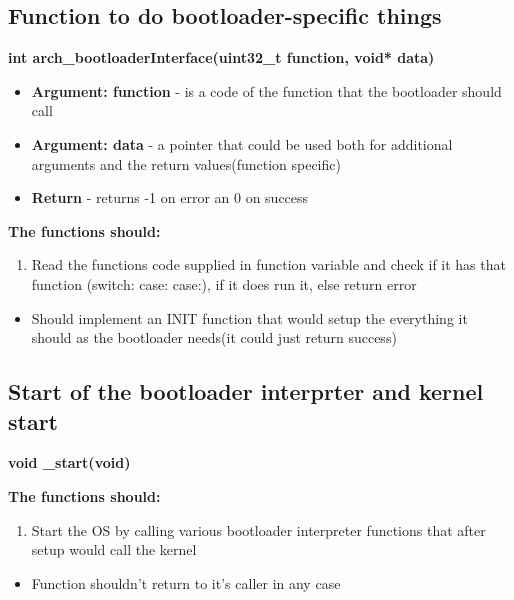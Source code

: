 \documentclass{report}
\begin{document}
\subsection*{Function to do bootloader-specific things}
\textbf{int arch\_bootloaderInterface(uint32\_t function, void* data)}
\begin{flushleft}
\begin{itemize}
	\item \textbf{Argument: function} - is a code of the function that the bootloader should call
	\item \textbf{Argument: data} - a pointer that could be used both for additional arguments and the return values(function specific)
	\item \textbf{Return} - returns -1 on error an 0 on success
\end{itemize}

\textbf{The functions should:}
\begin{enumerate}
	\item Read the functions code supplied in function variable and check if it has that function (switch: case: case:), if it does run it, else return error
\end{enumerate}
\begin{itemize}
	\item Should implement an INIT function that would setup the everything it should as the bootloader needs(it could just return success)
\end{itemize}
\end{flushleft}


\subsection*{Start of the bootloader interprter and kernel start}
\textbf{void \_start(void)}
\begin{flushleft}

\textbf{The functions should:}
\begin{enumerate}
	\item Start the OS by calling various bootloader interpreter functions that after setup would call the kernel
\end{enumerate}
\begin{itemize}
	\item Function shouldn't return to it's caller in any case
\end{itemize}
\end{flushleft}
\end{document}
